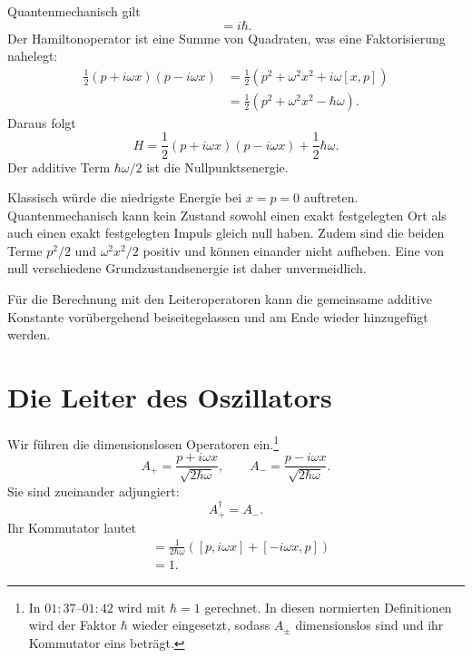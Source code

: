 Quantenmechanisch gilt
\begin{equation}
[x,p]=i\hbar.
\end{equation}
Der Hamiltonoperator ist eine Summe von Quadraten, was eine Faktorisierung nahelegt:
\begin{align}
\frac{1}{2}(p+i\omega x)(p-i\omega x)
&=\frac{1}{2}\left(p^2+\omega^2x^2+i\omega[x,p]\right) \\
&=\frac{1}{2}\left(p^2+\omega^2x^2-\hbar\omega\right).
\end{align}
Daraus folgt
\begin{equation}
H=\frac{1}{2}(p+i\omega x)(p-i\omega x)
+\frac{1}{2}\hbar\omega.
\end{equation}
Der additive Term \(\hbar\omega/2\) ist die Nullpunktsenergie.

Klassisch würde die niedrigste Energie bei \(x=p=0\) auftreten. Quantenmechanisch kann kein Zustand sowohl einen exakt festgelegten Ort als auch einen exakt festgelegten Impuls gleich null haben. Zudem sind die beiden Terme \(p^2/2\) und \(\omega^2x^2/2\) positiv und können einander nicht aufheben. Eine von null verschiedene Grundzustandsenergie ist daher unvermeidlich.

Für die Berechnung mit den Leiteroperatoren kann die gemeinsame additive Konstante vorübergehend beiseitegelassen und am Ende wieder hinzugefügt werden.

\begin{classroomqa}\end{classroomqa}

\section{Die Leiter des Oszillators}

Wir führen die dimensionslosen Operatoren ein.\footnote{In \(01{:}37\)--\(01{:}42\) wird mit \(\hbar=1\) gerechnet. In diesen normierten Definitionen wird der Faktor \(\hbar\) wieder eingesetzt, sodass \(A_\pm\) dimensionslos sind und ihr Kommutator eins beträgt.}
\begin{equation}
A_+=\frac{p+i\omega x}{\sqrt{2\hbar\omega}},
\qquad
A_-=\frac{p-i\omega x}{\sqrt{2\hbar\omega}}.
\end{equation}
Sie sind zueinander adjungiert:
\begin{equation}
A_+^\dagger=A_-.
\end{equation}
Ihr Kommutator lautet
\begin{align}
[A_-,A_+]
&=\frac{1}{2\hbar\omega}
\left([p,i\omega x]+[-i\omega x,p]\right) \\
&=1.
\end{align}

